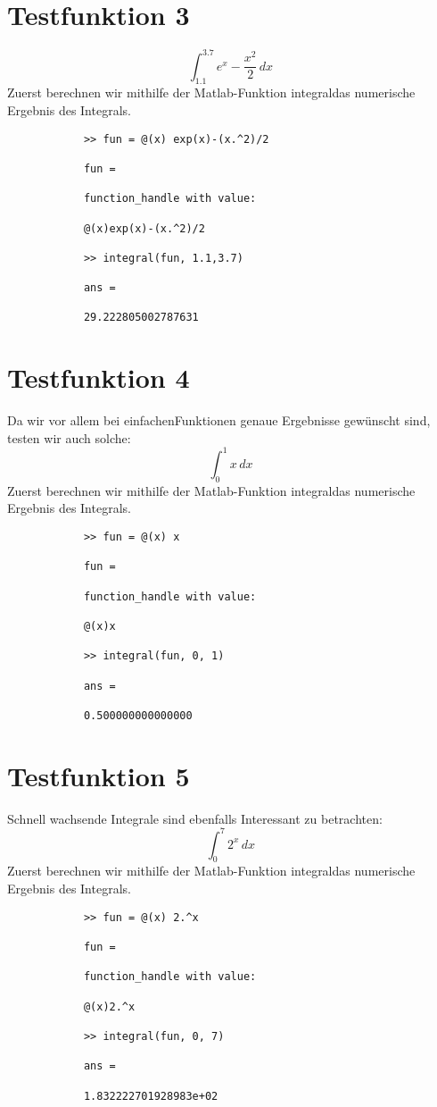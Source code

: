 \documentclass[11pt,titlepage]{article}
\begin{document}
	\section{Testfunktion 3}
		\begin{displaymath}
			\int_{1.1}^{3.7} e^{x} - \dfrac{x^2}{2}  \, dx\
		\end{displaymath}
		Zuerst berechnen wir mithilfe der Matlab-Funktion \glqq integral\grqq das numerische Ergebnis des Integrals.
		\begin{lstlisting}
			>> fun = @(x) exp(x)-(x.^2)/2
			
			fun =
			
			function_handle with value:
			
			@(x)exp(x)-(x.^2)/2
			
			>> integral(fun, 1.1,3.7)
			
			ans =
			
			29.222805002787631
		\end{lstlisting}

	\section{Testfunktion 4}
		Da wir vor allem bei \glqq einfachen\grqq Funktionen genaue Ergebnisse gewünscht sind, testen wir auch solche:
		\begin{displaymath}
			\int_{0}^1 x \, dx\
		\end{displaymath}
		Zuerst berechnen wir mithilfe der Matlab-Funktion \glqq integral\grqq das numerische Ergebnis des Integrals.
		\begin{lstlisting}
			>> fun = @(x) x
			
			fun =
			
			function_handle with value:
			
			@(x)x
			
			>> integral(fun, 0, 1)
			
			ans =
			
			0.500000000000000
		\end{lstlisting}

	\section{Testfunktion 5}
		Schnell wachsende Integrale sind ebenfalls Interessant zu betrachten:
		\begin{displaymath}
			\int_{0}^7 2^x \, dx\
		\end{displaymath}
		Zuerst berechnen wir mithilfe der Matlab-Funktion \glqq integral\grqq das numerische Ergebnis des Integrals.
		\begin{lstlisting}
			>> fun = @(x) 2.^x
			
			fun =
			
			function_handle with value:
			
			@(x)2.^x
			
			>> integral(fun, 0, 7)
			
			ans =
			
			1.832222701928983e+02
		\end{lstlisting}
\end{document}
